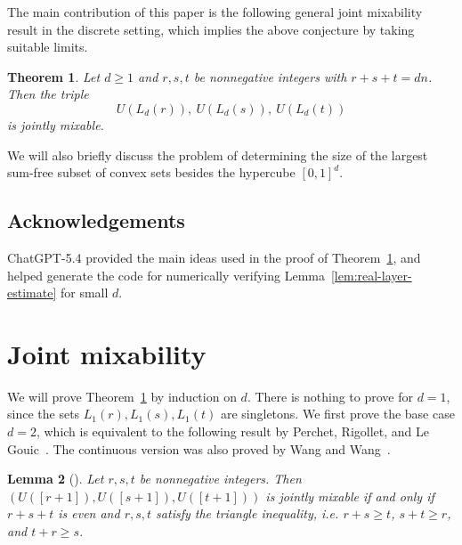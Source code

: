 \documentclass{article}
\newtheorem{thm}{Theorem}[section]
\newtheorem{lem}[thm]{Lemma}
\theoremstyle{definition}
\begin{document}
The main contribution of this paper is the following general joint mixability result in the discrete setting, which implies the above conjecture by taking suitable limits.

\begin{thm} \label{thm:joint-mix}
    Let $d\geq 1$ and $r,s,t$ be nonnegative integers with $r+s+t=dn$. Then the triple 
    \[U(L_{d}(r)),\ U(L_{d}(s)),\ U(L_{d}(t))\]
    is jointly mixable.
\end{thm}

We will also briefly discuss the problem of determining the size of the largest sum-free subset of convex sets besides the hypercube $[0,1]^d$.

\subsection{Acknowledgements}
ChatGPT-5.4 provided the main ideas used in the proof of Theorem~\ref{thm:joint-mix}, and helped generate the code for numerically verifying Lemma~\ref{lem:real-layer-estimate} for small $d$.


\section{Joint mixability}

We will prove Theorem~\ref{thm:joint-mix} by induction on $d$. There is nothing to prove for $d=1$, since the sets $L_{1}(r),L_{1}(s),L_{1}(t)$ are singletons. We first prove the base case $d=2$, which is equivalent to the following result by Perchet, Rigollet, and Le Gouic~\cite{PRL24}. The continuous version was also proved by Wang and Wang~\cite{WW16}.

\begin{lem}[{\cite[Proposition~15]{PRL24}}] \label{lem:1d-joint-mix}
    Let $r,s,t$ be nonnegative integers. Then $(U([r+1]),U([s+1]),U([t+1]))$ is jointly mixable if and only if $r+s+t$ is even and $r,s,t$ satisfy the triangle inequality, i.e. $r+s \geq t$, $s+t \geq r$, and $t+r \geq s$.
\end{lem}
\end{document}
